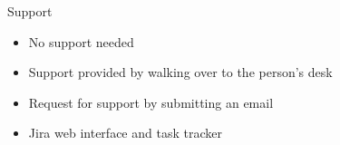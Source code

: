 Support
\begin{itemize}
    \item No support needed
    \item Support provided by walking over to the person's desk
    \item Request for support by submitting an email
    \item Jira web interface and task tracker
\end{itemize}
